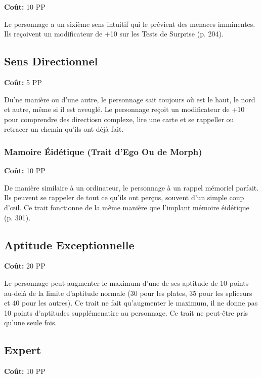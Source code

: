 \textbf{Coût:} 10 PP 

Le personnage a un sixième sens intuitif qui le prévient des menaces imminentes. Ils reçoivent un modificateur de +10 sur les Tests de Surprise (p. 204). 

\subsection{Sens Directionnel} \label{sec:traits-direction-sense} 

\textbf{Coût:} 5 PP 

Du'ne manière ou d'une autre, le personnage sait toujours où est le haut, le nord et autre, même si il est aveuglé. Le personnage reçoit un modificateur de +10 pour comprendre des directiosn complexe, lire une carte et se rappeller ou retracer un chemin qu'ils ont déjà fait. 





\subsubsection{Mamoire Éidétique (Trait d'Ego Ou de Morph)} \label{sec:traits-eidetic-memory} \textbf{Coût:} 10 PP 

De manière similaire à un ordinateur, le personnage à un rappel mémoriel parfait. Ils peuvent se rappeler de tout ce qu'ils ont perçus, souvent d'un simple coup d'œil. Ce trait fonctionne de la même manière que l'implant mémoire éidétique (p. 301). 

\subsection{Aptitude Exceptionnelle} \label{sec:traits-exceptional-aptitude} 

\textbf{Coût:} 20 PP 

Le personnage peut augmenter le maximum d'une de ses aptitude de 10 points au-delà de la limite d'aptitude normale (30 pour les plates, 35 pour les spliceurs et 40 pour les autres). Ce trait ne fait qu'augmenter le maximum, il ne donne pas 10 points d'aptitudes supplémenatire au personnage. Ce trait ne peut-être pris qu'une seule fois. 

\subsection{Expert} \label{sec:traits-expert} 

\textbf{Coût:} 10 PP 


